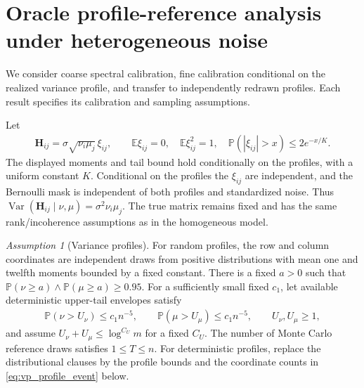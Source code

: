 \documentclass[numsec,webpdf,modern,large,namedate]{oup-authoring-template}
\theoremstyle{plain}
\theoremstyle{remark}
\newtheorem{sassumption}{Assumption}
\newcommand{\bH}{\bm{H}}
\newif\ifmarkchanges
\newenvironment{revision}{\begingroup\ifmarkchanges\color{red}\fi}{\endgroup}
\begin{document}
\begin{revision}
\section{Oracle profile-reference analysis under heterogeneous noise}
\label{sec:heterogeneous_noise}
We consider coarse spectral calibration, fine calibration conditional on
the realized variance profile, and transfer to independently redrawn
profiles.  Each result specifies its calibration and sampling assumptions.

Let
\begin{align}
 \bH_{ij}=\sigma\sqrt{\nu_i\mu_j}\,\xi_{ij},\qquad
 \mathbb E\xi_{ij}=0,\quad\mathbb E\xi_{ij}^2=1,
 \quad \mathbb P(|\xi_{ij}|>x)\le2e^{-x/K}.
 \label{eq:vp_noise_model}
\end{align}
The displayed moments and tail bound hold conditionally on the profiles,
with a uniform constant $K$.  Conditional on the profiles the $\xi_{ij}$
are independent, and the
Bernoulli mask is independent of both profiles and standardized noise.
Thus $\operatorname{Var}(\bH_{ij}\mid\nu,\mu)=\sigma^2\nu_i\mu_j$.
The true matrix remains fixed and has the same rank/incoherence assumptions
as in the homogeneous model.


\begin{sassumption}[Variance profiles]
\label{assum:vp_regular}
For random profiles, the row and column coordinates are independent draws
from positive distributions with mean one and twelfth moments bounded by
a fixed constant.
There is a fixed $a>0$ such that
$\mathbb P(\nu\ge a)\wedge\mathbb P(\mu\ge a)\ge0.95$.
For a sufficiently small fixed $c_1$, let available deterministic
upper-tail envelopes satisfy
\begin{align}
 \mathbb P(\nu>U_\nu)\le c_1n^{-5},\qquad
 \mathbb P(\mu>U_\mu)\le c_1n^{-5},\qquad U_\nu,U_\mu\ge1,
 \label{eq:vp_U_definition}
\end{align}
and assume $U_\nu+U_\mu\le\log^{C_U}m$ for a fixed $C_U$.
The number of Monte Carlo reference draws satisfies $1\le T\le n$.
For deterministic profiles, replace the distributional clauses by the
profile bounds and the coordinate counts in \eqref{eq:vp_profile_event}
below.
\end{sassumption}


\end{revision}
\end{document}
